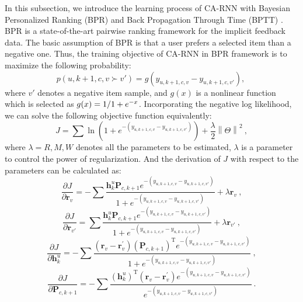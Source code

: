\documentclass{sig-alternate}
\begin{document}
In this subsection, we introduce the learning process of CA-RNN with Bayesian Personalized Ranking (BPR) \cite{rendle2009bpr} and Back Propagation Through Time (BPTT) \cite{rumelhart1988learning}.
BPR is a state-of-the-art pairwise ranking framework for the implicit feedback data. The basic assumption of BPR is that a user prefers a selected item than a negative one. Thus, the training objective of CA-RNN in BPR framework is to maximize the following probability:
\begin{equation}
p(u, k+1, c, v\succ v') = g(y_{u, k+1, c, v} - y_{u, k+1, c, v'}),~
\end{equation}
where $v'$ denotes a negative item sample, and $g(x)$ is a nonlinear function which is selected as $g(x) = {1 \mathord{\left/ \right. \kern-\nulldelimiterspace} 1 + e^{ - x}}$. Incorporating the negative log likelihood, we can solve the following objective function equivalently:
\begin{equation}
J = \sum \ln(1+e^{-(y_{u,k+1,c,v} - y_{u,k+1,c,v'})})+\frac{\lambda }{2}\left \| \Theta  \right \|^{2}  ~,
\end{equation}
where $\lambda = {R, M ,W}$ denotes all the parameters to be estimated, $\lambda$ is a parameter to control the power of regularization. And the derivation of $J$ with respect to the parameters can be calculated as: 
\begin{displaymath}
\frac{\partial J}{\partial \mathbf{r}_{v}} = -\sum \frac{\mathbf{h}_{k}^{u}\mathbf{P}_{c,k+1}e^{-(y_{u, k+1, c, v} - y_{u, k+1, c, v'})}}{1+e^{-(y_{u, k+1, c, v} - y_{u, k+1, c, v'})}}+\lambda \mathbf{r}_{v}  ~,
\end{displaymath}
\begin{displaymath}
\frac{\partial J}{\partial \mathbf{r}_{v'}} = \sum \frac{\mathbf{h}_{k}^{u}\mathbf{P}_{c,k+1}e^{-(y_{u, k+1, c, v} - y_{u, k+1, c, v'})}}{1+e^{-(y_{u, k+1, c, v} - y_{u, k+1, c, v'})}}+\lambda \mathbf{r}_{v'}  ~,
\end{displaymath}
\begin{displaymath}
\frac{\partial J}{\partial \mathbf{h}_{k}^{u}} = -\sum \frac{(\mathbf{r}_{v}-\mathbf{r}_{v}^{'})(\mathbf{P}_{c,k+1})^{\mathrm{ T }}e^{-(y_{u, k+1, c, v} - y_{u, k+1, c, v'})}}{1+e^{-(y_{u, k+1, c, v} - y_{u, k+1, c, v'})}}   ~,
\end{displaymath}
\begin{displaymath}
\frac{\partial J}{\partial \mathbf{P}_{c,k+1}} = -\sum \frac{(\mathbf{h}_{k}^{u})^{\mathrm T}(\mathbf{r}_{v}-\mathbf{r}_{v}^{'})e^{-(y_{u, k+1, c, v} - y_{u, k+1, c, v'})}
}{e^{-(y_{u, k+1, c, v} - y_{u, k+1, c, v'})}}    ~.
\end{displaymath}
\end{document}
